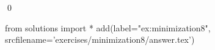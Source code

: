 
\begin{ex} 
  \label{ex:minimization8}
  
  \qed
\end{ex} 
\begin{python0}
from solutions import *
add(label="ex:minimization8",
    srcfilename='exercises/minimization8/answer.tex') 
\end{python0}
